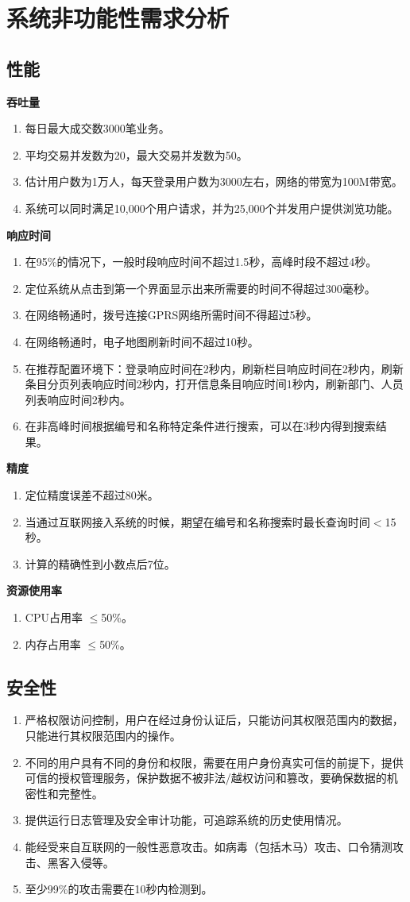 \section{系统非功能性需求分析}
\subsection{性能}
\textbf{吞吐量}
\begin{enumerate}
\item 每日最大成交数3000笔业务。
\item 平均交易并发数为20，最大交易并发数为50。
\item 估计用户数为1万人，每天登录用户数为3000左右，网络的带宽为100M带宽。
\item 系统可以同时满足10,000个用户请求，并为25,000个并发用户提供浏览功能。
\end{enumerate}
\textbf{响应时间}
\begin{enumerate}
\item 在95\%的情况下，一般时段响应时间不超过1.5秒，高峰时段不超过4秒。
\item 定位系统从点击到第一个界面显示出来所需要的时间不得超过300毫秒。
\item 在网络畅通时，拨号连接GPRS网络所需时间不得超过5秒。
\item 在网络畅通时，电子地图刷新时间不超过10秒。
\item 在推荐配置环境下：登录响应时间在2秒内，刷新栏目响应时间在2秒内，刷新条目分页列表响应时间2秒内，打开信息条目响应时间1秒内，刷新部门、人员列表响应时间2秒内。
\item 在非高峰时间根据编号和名称特定条件进行搜索，可以在3秒内得到搜索结果。
\end{enumerate}
\textbf{精度}
\begin{enumerate}
\item 定位精度误差不超过80米。
\item 当通过互联网接入系统的时候，期望在编号和名称搜索时最长查询时间$<$15秒。
\item 计算的精确性到小数点后7位。
\end{enumerate}
\textbf{资源使用率}
\begin{enumerate}
\item CPU占用率 $\leq$50\%。
\item 内存占用率 $\leq$50\%。
\end{enumerate}
\subsection{安全性}
\begin{enumerate}
\item 严格权限访问控制，用户在经过身份认证后，只能访问其权限范围内的数据，只能进行其权限范围内的操作。
\item 不同的用户具有不同的身份和权限，需要在用户身份真实可信的前提下，提供可信的授权管理服务，保护数据不被非法/越权访问和篡改，要确保数据的机密性和完整性。
\item 提供运行日志管理及安全审计功能，可追踪系统的历史使用情况。
\item 能经受来自互联网的一般性恶意攻击。如病毒（包括木马）攻击、口令猜测攻击、黑客入侵等。
\item 至少99\%的攻击需要在10秒内检测到。
\end{enumerate}
